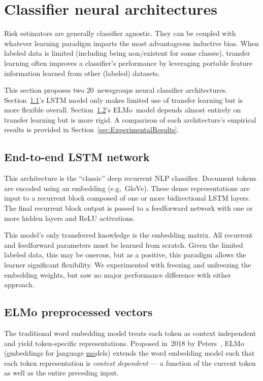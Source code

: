 \section{Classifier neural architectures}\label{sec:Architectures}

Risk estimators are generally classifier agnostic.  They can be coupled with whatever learning paradigm imparts the most advantageous inductive bias. When labeled data is limited (including being non\-/existent for some classes), transfer learning often improves a classifier's performance by leveraging portable feature information learned from other (labeled) datasets.

This section proposes two 20~newsgroups neural classifier architectures.  Section~\ref{sec:Architectures:LSTM}'s LSTM model only makes limited use of transfer learning but is more flexible overall.  Section~\ref{sec:Architectures:ELMo}'s ELMo~model depends almost entirely on transfer learning but is more rigid. A comparison of each architecture's empirical results is provided in Section~\ref{sec:ExperimentalResults}.

\subsection{End-to-end LSTM network}\label{sec:Architectures:LSTM}

This architecture is the ``classic'' deep recurrent NLP classifier. Document tokens are encoded using an embedding (e.g,~GloVe). These dense representations are input to a recurrent block composed of one or more bidirectional LSTM layers.  The final recurrent block output is passed to a feedforward network with one or more hidden layers and ReLU activations.

This model's only transferred knowledge is the embedding matrix. All recurrent and feedforward parameters must be learned from scratch.  Given the limited labeled data, this may be onerous, but as a positive, this paradigm allows the learner significant flexibility.  We experimented with freezing and unfreezing the embedding weights, but saw no major performance difference with either approach.

\subsection{ELMo preprocessed vectors}\label{sec:Architectures:ELMo}

The traditional word embedding model treats each token as context independent and yield token-specific representations. Proposed in~2018 by Peters\etal~\cite{Peters:2018}, ELMo (\underline{e}mbeddings for \underline{l}anguage \underline{mo}dels) extends the word embedding model such that each token representation is \textit{context dependent} --- a function of the current token as well as the entire preceding input.

